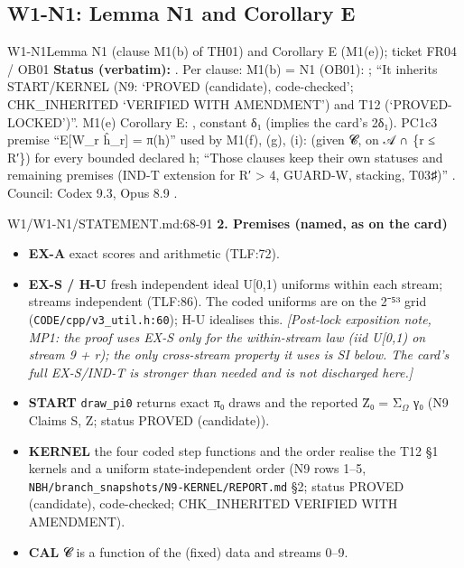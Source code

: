 \subsection{W1-N1: Lemma N1 and Corollary E}\label{sec:loop:n1}
\begin{card}{W1-N1}{Lemma N1 (clause M1(b) of TH01) and Corollary E (M1(e)); ticket FR04 / OB01}
\textbf{Status (verbatim):}  . Per clause: M1(b) = N1 (OB01): ; ``It inherits START/KERNEL (N9: `PROVED (candidate), code-checked'; CHK\_INHERITED `VERIFIED WITH AMENDMENT') and T12 (`PROVED-LOCKED')''. M1(e) Corollary E: , constant δ₁ (implies the card's 2δ₁). PC1c3 premise ``E[W\_r ĥ\_r] = π(h)'' used by M1(f), (g), (i):  (given 𝓒, on 𝒜 ∩ \{r ≤ R′\}) for every bounded declared h; ``Those clauses keep their own statuses and remaining premises (IND-T extension for R′ > 4, GUARD-W, stacking, T03♯)'' . Council: Codex 9.3, Opus 8.9 .
\begin{stmt}{W1/W1-N1/STATEMENT.md:68-91}
\textbf{2. Premises (named, as on the card)}
\begin{itemize}
\item \textbf{EX-A} exact scores and arithmetic (TLF:72).
\item \textbf{EX-S / H-U} fresh independent ideal U[0,1) uniforms within each stream; streams independent (TLF:86). The coded
  uniforms are on the 2⁻⁵³ grid (\texttt{CODE/cpp/v3\_util.h:60}); H-U idealises this. \emph{[Post-lock exposition note, MP1: the proof
  uses EX-S only for the within-stream law (iid U[0,1) on stream 9 + r); the only cross-stream property it uses is SI
  below. The card's full EX-S/IND-T is stronger than needed and is not discharged here.]}
\item \textbf{START} \texttt{draw\_pi0} returns exact π₀ draws and the reported Z̄₀ = Σ$_{\Omega}$ γ₀ (N9 Claims S, Z; status PROVED (candidate)).
\item \textbf{KERNEL} the four coded step functions and the order realise the T12 §1 kernels and a uniform state-independent order
  (N9 rows 1–5, \texttt{NBH/branch\_snapshots/N9-KERNEL/REPORT.md} §2; status PROVED (candidate), code-checked; CHK\_INHERITED
  VERIFIED WITH AMENDMENT).
\item \textbf{CAL} 𝓒 is a function of the (fixed) data and streams 0–9.

\end{itemize}
\end{stmt}
\end{card}
